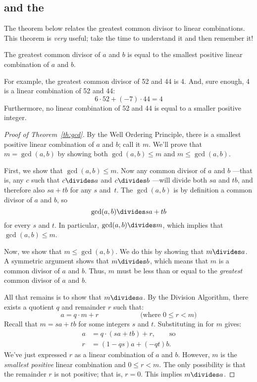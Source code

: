 \begin{editingnotes}
\subsection{ and the }

The theorem below relates the greatest common divisor to linear combinations.  This
theorem is \emph{very} useful; take the time to understand it and then remember it!

\begin{theorem} \label{th:gcd} The greatest common divisor of $a$ and $b$ is equal to
the smallest positive linear combination of $a$ and $b$.  \end{theorem}

For example, the greatest common divisor of 52 and 44 is 4.  And, sure enough, 4 is a
linear combination of 52 and 44:
\[
6 \cdot 52 + (-7) \cdot 44 = 4
\]
Furthermore, no linear combination of 52 and 44 is equal to a smaller positive integer.

\begin{proof}[Proof of Theorem~\ref{th:gcd}] By the Well Ordering Principle, there is a
smallest positive linear combination of $a$ and $b$; call it $m$.  We'll prove that $m =
\gcd(a, b)$ by showing both $\gcd(a, b) \leq m$ and $m \leq \gcd(a, b)$.

First, we show that $\gcd(a, b) \leq m$.  Now any common divisor of $a$ and $b$ ---that
is, any $c$ such that $c \divides a$ and $c \divides b$ ---will divide both $sa$ and
$tb$, and therefore also $sa+tb$ for any $s$ and~$t$.  The $\gcd(a, b)$ is by definition
a common divisor of $a$ and $b$, so 
\begin{equation}\label{gcdabdivlin} \gcd(a, b)
\divides s a + t b
\end{equation}
for every $s$ and $t$.  In particular, $\gcd(a, b) \divides m$, which implies that $\gcd(a,
b) \leq m$.

Now, we show that $m \leq \gcd(a, b)$.  We do this by showing that $m \divides a$.  A
symmetric argument shows that $m \divides b$, which means that $m$ is a common divisor
of $a$ and $b$.  Thus, $m$ must be less than or equal to the \emph{greatest} common
divisor of $a$ and $b$.

All that remains is to show that $m \divides a$.  By the Division Algorithm, there
exists a quotient $q$ and remainder $r$ such that: 
\[
a = q \cdot m + r \hspace{1in} \text{(where $0 \leq r < m$)} \]
Recall that $m = s a + t b$ for some integers $s$ and
$t$.  Substituting in for $m$ gives:
\begin{align*} a & = q \cdot (s a + t b) + r,
\qquad \text{so} \\ r & = (1 - qs) a + (-qt) b.
\end{align*}
We've just expressed $r$ as a linear combination of $a$ and $b$.  However, $m$ is the
\emph{smallest positive} linear combination and $0 \leq r < m$.  The only possibility is
that the remainder $r$ is not positive; that is, $r = 0$.  This implies $m \divides
a$.  \end{proof}


\end{editingnotes}
